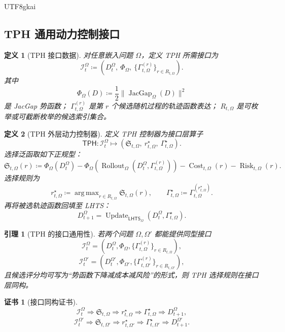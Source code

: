 \documentclass[12pt]{article}
\newtheorem{definition}{定义}[section]
\newtheorem{lemma}{引理}[section]
\newtheorem{Certificate}{证书}[section]
\newcommand{\LHTS}{\ensuremath{\mathsf{LHTS}}}
\newcommand{\TPH}{\ensuremath{\mathsf{TPH}}}
\newcommand{\DefEq}{\coloneqq}
\DeclareMathOperator{\Cost}{Cost}
\DeclareMathOperator{\JacGap}{JacGap}
\DeclareMathOperator{\Update}{Update}
\DeclareMathOperator{\Rollout}{Rollout}
\DeclareMathOperator{\Risk}{Risk}
\DeclareMathOperator*{\argmax}{arg\,max}
\begin{document}
\begin{CJK*}{UTF8}{gkai}
\subsection{TPH 通用动力控制接口}
\label{subsec:tph-universal-control-interface}

\begin{definition}[TPH 接口数据]
对任意嵌入问题 \(\Omega\)，定义 TPH 所需接口为
\[
\boxed{
\mathcal I_t^\Omega
\DefEq
\left(
D_t^\Omega,\ \Phi_\Omega,\ \{\Gamma_{t,\Omega}^{(r)}\}_{r\in R_{t,\Omega}}
\right).
}
\]
其中
\[
\Phi_\Omega(D)
\DefEq
\frac12\|\JacGap_\Omega(D)\|^2
\]
是 JacGap 势函数；
\(\Gamma_{t,\Omega}^{(r)}\) 是第 \(r\) 个候选随机过程的轨迹函数表达；
\(R_{t,\Omega}\) 是可枚举或可截断枚举的候选索引集合。
\end{definition}

\begin{definition}[TPH 外层动力控制器]
定义 TPH 控制器为接口层算子
\[
\boxed{
\TPH:
\mathcal I_t^\Omega
\longmapsto
\left(
\mathfrak S_{t,\Omega},\
r_{t,\Omega}^\star,\
\Gamma_{t,\Omega}^\star
\right).
}
\]
选择泛函取如下正规型：
\[
\boxed{
\mathfrak S_{t,\Omega}(r)
\DefEq
\Phi_\Omega(D_t^\Omega)
-
\Phi_\Omega\!\left(
\Rollout_\Omega(D_t^\Omega,\Gamma_{t,\Omega}^{(r)})
\right)
-
\Cost_{t,\Omega}(r)
-
\Risk_{t,\Omega}(r).
}
\]
选择规则为
\[
\boxed{
r_{t,\Omega}^\star
\DefEq
\argmax_{r\in R_{t,\Omega}}
\mathfrak S_{t,\Omega}(r),
\qquad
\Gamma_{t,\Omega}^\star
\DefEq
\Gamma_{t,\Omega}^{(r_{t,\Omega}^\star)}.
}
\]
再将被选轨迹函数回填至 LHTS：
\[
\boxed{
D_{t+1}^\Omega
=
\Update_{\LHTS_\Omega}
\left(D_t^\Omega,\Gamma_{t,\Omega}^\star\right).
}
\]
\end{definition}

\begin{lemma}[TPH 的接口通用性]
若两个问题 \(\Omega,\Omega'\) 都能提供同型接口
\[
\mathcal I_t^\Omega
=
\left(D_t^\Omega,\Phi_\Omega,\{\Gamma_{t,\Omega}^{(r)}\}_{r\in R_{t,\Omega}}\right),
\]
\[
\mathcal I_t^{\Omega'}
=
\left(D_t^{\Omega'},\Phi_{\Omega'},
\{\Gamma_{t,\Omega'}^{(r)}\}_{r\in R_{t,\Omega'}}\right),
\]
且候选评分均可写为“势函数下降减成本减风险”的形式，则 TPH 选择规则在接口层同构。
\end{lemma}

\begin{Certificate}[接口同构证书]
\[
\boxed{
\mathcal I_t^\Omega
\Rightarrow
\mathfrak S_{t,\Omega}
\Rightarrow
r_{t,\Omega}^\star
\Rightarrow
\Gamma_{t,\Omega}^\star
\Rightarrow
D_{t+1}^\Omega,
}
\]
\[
\boxed{
\mathcal I_t^{\Omega'}
\Rightarrow
\mathfrak S_{t,\Omega'}
\Rightarrow
r_{t,\Omega'}^\star
\Rightarrow
\Gamma_{t,\Omega'}^\star
\Rightarrow
D_{t+1}^{\Omega'}.
}
\]
\end{Certificate}


\end{CJK*}
\end{document}
